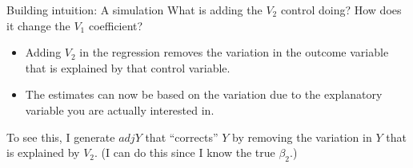 \documentclass[
  ignorenonframetext,
]{beamer}
\newenvironment{Shaded}{\begin{snugshade}}{\end{snugshade}}
\newcommand{\NormalTok}[1]{#1}
\newcommand{\OtherTok}[1]{\textcolor[rgb]{0.56,0.35,0.01}{#1}}
\newcommand{\SpecialCharTok}[1]{\textcolor[rgb]{0.00,0.00,0.00}{#1}}
\begin{document}
\begin{frame}[fragile]{Building intuition: A simulation}
\protect\hypertarget{building-intuition-a-simulation-4}{}
What is adding the \(V_2\) control doing? How does it change the \(V_1\)
coefficient?

\begin{itemize}
\item
  Adding \(V_2\) in the regression removes the variation in the outcome
  variable that is explained by that control variable.
\item
  The estimates can now be based on the variation due to the explanatory
  variable you are actually interested in.
\end{itemize}

To see this, I generate \(adjY\) that ``corrects'' \(Y\) by removing the
variation in \(Y\) that is explained by \(V_2\). (I can do this since I
know the true \(\beta_2\).)

\begin{Shaded}
\end{Shaded}
\end{frame}
\end{document}
